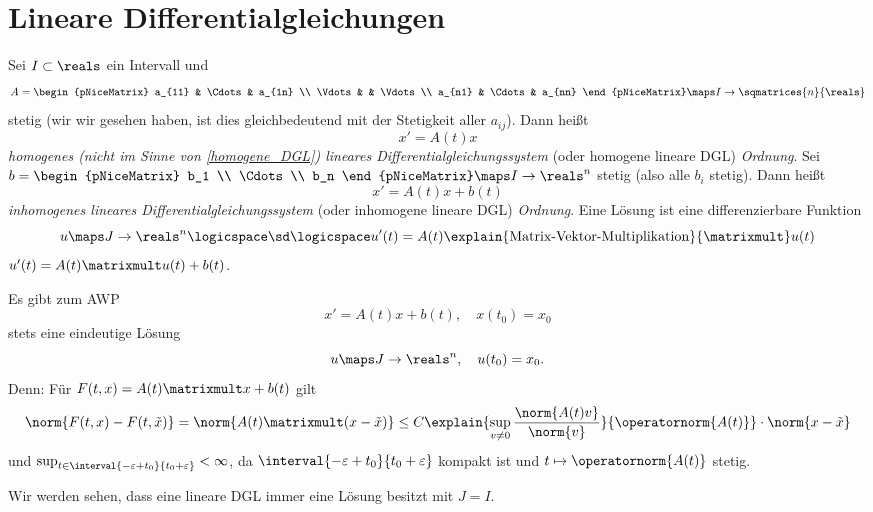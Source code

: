 \section{Lineare Differentialgleichungen}
\begin{definition}\label{homogenes_lineares_dgl_system}
  Sei \( I\subset \reals \) ein Intervall und 
  \begin{equation*}
    A=\begin{pNiceMatrix} a_{11} & \Cdots & a_{1n} \\ \Vdots &  & \Vdots \\ a_{n1} & \Cdots & a_{nn} \end{pNiceMatrix}\maps I\to \sqmatrices{n}{\reals}
  \end{equation*}
  stetig (wir wir gesehen haben, ist dies gleichbedeutend mit der Stetigkeit aller \( a_{ij} \)). Dann heißt
  \begin{equation*}
    x'=A(t)x
  \end{equation*}
  \emph{homogenes (nicht im Sinne von \ref{homogene_DGL}) lineares Differentialgleichungssystem} (oder homogene lineare DGL) \emph{ Ordnung}. Sei \( b=\begin{pNiceMatrix} b_1 \\ \Cdots \\ b_n \end{pNiceMatrix}\maps I\to \reals^n \) stetig (also alle \( b_i \) stetig). Dann heißt
  \begin{equation*}
    x'=A(t)x+b(t)
  \end{equation*}
  \emph{inhomogenes lineares Differentialgleichungssystem} (oder inhomogene lineare DGL) \emph{ Ordnung}. Eine Lösung ist eine differenzierbare Funktion
  \begin{equation*}
    u\maps J\to \reals^n \logicspace \text{\sd}\logicspace u'(t)=A(t)\explain{\text{Matrix-Vektor-Multiplikation}}{\matrixmult} u(t)
  \end{equation*}
  \bzw \( u'(t)=A(t)\matrixmult u(t)+b(t) \).
\end{definition}
\begin{bemerkung*}
  Es gibt zum AWP
  \begin{equation*}
    x'=A(t)x+b(t),\quad x(t_0)=x_0
  \end{equation*}
  stets eine eindeutige Lösung
  \begin{equation*}
    u\maps J\to \reals^n, \quad u(t_0)=x_0.
  \end{equation*}
  Denn: Für \( F(t,x)=A(t)\matrixmult x+b(t) \) gilt
  \begin{equation*}
    \norm{F(t,x)-F(t,\tilde{x})}=\norm{A(t)\matrixmult(x-\tilde{x})}\leq C\explain{\sup_{v\neq 0}\frac{\norm{A(t)v}}{\norm{v}}}{\operatornorm{A(t)}}\cdot\norm{x-\tilde{x}}
  \end{equation*}
  und \( \sup_{t\in \interval{-\varepsilon+t_0}{t_0+\varepsilon}}<\infty \), da \( \interval{-\varepsilon+t_0}{t_0+\varepsilon} \) kompakt ist und \( t\mapsto \operatornorm{A(t)} \) stetig. 

  Wir werden sehen, dass eine lineare DGL immer eine Lösung besitzt mit \( J=I \).
\end{bemerkung*}

